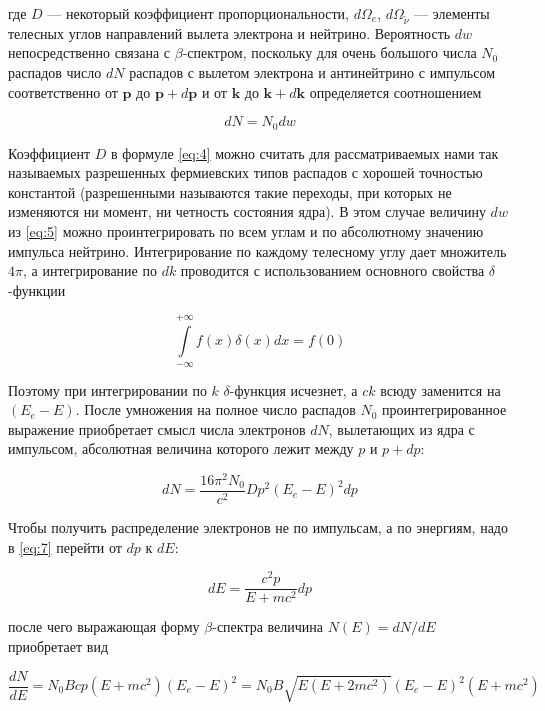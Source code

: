 \documentclass[a4paper,12pt]{article}
\begin{document}
где $D$ — некоторый коэффициент пропорциональности, $d \Omega_e$, $d \Omega_{\tilde{\nu}}$ — элементы телесных углов направлений вылета электрона и нейтрино. Вероятность $dw$ непосредственно связана с $\beta$-спектром, поскольку для очень большого числа $N_0$ распадов число $dN$ распадов с вылетом электрона и антинейтрино с импульсом соответственно от $\mathbf{p}$ до $\mathbf{p} + d\mathbf{p}$ и от $\mathbf{k}$ до $\mathbf{k} + d\mathbf{k}$ определяется соотношением


\begin{equation}\label{eq:5}
    dN = N_0 dw
\end{equation}


Коэффициент $D$ в формуле \eqref{eq:4} можно считать для рассматриваемых нами так называемых разрешенных фермиевских типов распадов с хорошей точностью константой (разрешенными называются такие переходы, при которых не изменяются ни момент, ни четность состояния ядра). В этом случае величину $dw$ из \eqref{eq:5} можно проинтегрировать по всем углам и по абсолютному значению импульса нейтрино. Интегрирование по каждому телесному углу дает множитель $4 \pi$, а интегрирование по $dk$ проводится с использованием основного свойства $\delta$-функции


\begin{equation}\label{eq:6}
    \int\limits_{-\infty}^{+\infty} f(x) \delta(x) dx = f(0)
\end{equation}

Поэтому при интегрировании по $k$ $\delta$-функция исчезнет, а $ck$ всюду заменится на $(E_e - E)$. После умножения на полное число распадов $N_0$ проинтегрированное выражение приобретает смысл числа электронов $dN$, вылетающих из ядра с импульсом, абсолютная величина которого лежит между $p$ и $p + dp$:

\begin{equation}\label{eq:7}
    dN = \frac{16 \pi^2 N_0 }{c^2} D p^2 \left( E_e - E \right)^2 dp
\end{equation}

Чтобы получить распределение электронов не по импульсам, а по энергиям, надо в \eqref{eq:7} перейти от $dp$ к $dE$:

\begin{equation}\label{eq:8}
    dE = \frac{c^2 p}{E + mc^2}dp
\end{equation}


после чего выражающая форму $\beta$-спектра величина $N (E) = dN/dE$ приобретает вид

\begin{equation}\label{eq:9}
    \frac{dN}{dE} = N_0 B cp \left( E + mc^2 \right) \left( E_e - E \right)^2 = N_0 B \sqrt{E \left( E + 2mc^2 \right)} \left( E_e - E \right)^2 \left( E + mc^2 \right)
\end{equation}
\end{document}
